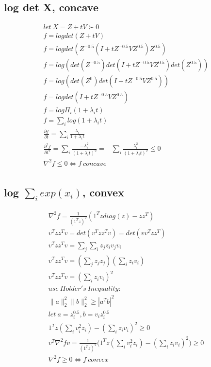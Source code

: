 \documentclass[8pt]{extarticle}
\begin{document}
\begin{multicols*}{2}
  \subsection{log det X, concave}
  \begin{align*}
    let\ X=Z+tV \succ 0\\
    f=log det(Z+tV)\\
    f=log det(Z^{-0.5}(I+tZ^{-0.5}VZ^{0.5})Z^{0.5})\\
    f=log (det(Z^{-0.5})det(I+tZ^{-0.5}VZ^{0.5})det(Z^{0.5}))\\
    f=log (det(Z^{0})det(I+tZ^{-0.5}VZ^{0.5}))\\
    f=log det(I+tZ^{-0.5}VZ^{0.5})\\
    f=log \Pi_i (1+\lambda_i t)\\
    f=\sum_i log(1+\lambda_i t)\\
    \frac{\partial f}{\partial t} = \sum_i \frac{\lambda_i}{1+\lambda_i t}\\
    \frac{\partial^2 f}{\partial t^2} = \sum_i \frac{-\lambda_i^2}{(1+\lambda_i t)^2} = -\sum_i \frac{\lambda_i^2}{(1+\lambda_i t)^2} \leq 0\\
    \nabla^2 f \leq 0 \iff f\ concave\\
  \end{align*}

  \vfill\null
  \columnbreak
    
  \subsection{log $\sum_i exp(x_i)$, convex}
  \begin{align*}
    \nabla^2 f = \frac{1}{(1^Tz)^2} (1^Tz diag(z) -zz^T)\\
    v^T zz^T v = det(v^T zz^T v) = det(vv^T zz^T)\\
    v^T zz^T v = \sum_j \sum_i z_j z_i v_j v_i\\
    v^T zz^T v = (\sum_j z_j z_j)(\sum_i z_i v_i)\\
    v^T zz^T v = (\sum_i z_i v_i)^2\\
    use\ Holder's\ Inequality:\\
    \|a\|_2^2 \|b\|_2^2 \geq |a^Tb|^2\\
    let\ a = z_i^{0.5}, b=v_iz_i^{0.5}\\
    1^Tz(\sum_i v_i^2 z_i)-(\sum_i z_i v_i)^2 \geq 0\\
    v^T\nabla^2f v = \frac{1}{(1^Tz)^2} \bigg(1^Tz(\sum_i v_i^2 z_i)-(\sum_i z_i v_i)^2\bigg) \geq 0\\
    \nabla^2f \geq 0 \iff f\ convex
  \end{align*}  
  

\end{multicols*}
\end{document}
